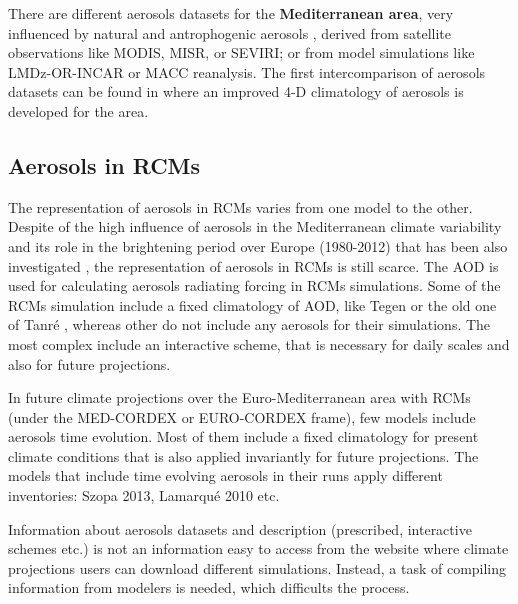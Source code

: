 There are different aerosols datasets for the \textbf{Mediterranean area}, very influenced by natural and antrophogenic aerosols \cite*{Lelieveld}, derived from satellite observations like MODIS, MISR, or SEVIRI; or from model simulations like LMDz-OR-INCAR or MACC reanalysis. The first intercomparison of aerosols datasets can be found in \cite*{Nabat2013} where an improved 4-D climatology of aerosols is developed for the area.

\subsection{Aerosols in RCMs}

The representation of aerosols in RCMs varies from one model to the other. Despite of the high influence of aerosols in the Mediterranean climate variability \cite*{Nabat2015} and its role in the brightening period over Europe (1980-2012) that has been also investigated \cite*{Nabat2015, Nabat2015a, Wild2009}, the representation of aerosols in RCMs is still scarce. The AOD is used for calculating aerosols radiating forcing in RCMs simulations. Some of the RCMs simulation include a fixed climatology of AOD, like Tegen or the old one of Tanré \cite*{Tegen1997, Tanre1984}, whereas other do not include any aerosols for their simulations. The most complex include an interactive scheme, that is necessary for daily scales and also for future projections.


In future climate projections over the Euro-Mediterranean area with RCMs (under the MED-CORDEX or EURO-CORDEX frame), few models include aerosols time evolution. Most of them include a fixed climatology for present climate conditions that is also applied invariantly for future projections. The models that include time evolving aerosols in their runs apply different inventories: Szopa 2013, Lamarqué 2010 etc.

Information about aerosols datasets and description (prescribed, interactive schemes etc.) is not an information easy to access from the website where climate projections users can download different simulations. Instead, a task of compiling information from modelers is needed, which difficults the process. %

